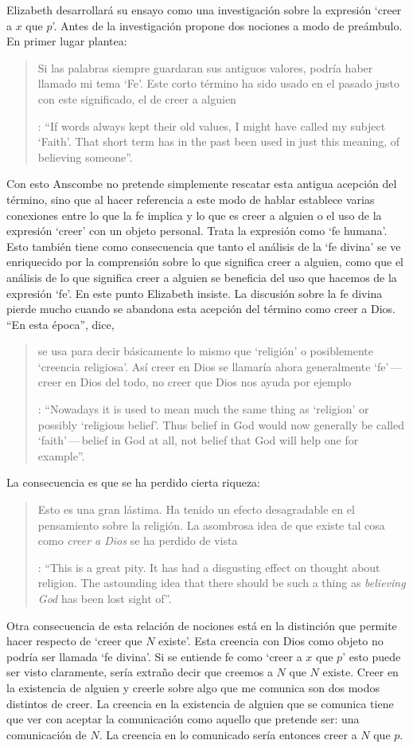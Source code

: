 Elizabeth desarrollará su ensayo como una investigación sobre la expresión \enquote*{creer a $x$ que $p$}. Antes de la investigación propone dos nociones a modo de preámbulo. En primer lugar plantea: \blockquote[{\Cite[1]{anscombe2008faith:tobelieve}}: \enquote{If words always kept their old values, I might have called my subject `Faith'. That short term has in the past been used in just this meaning, of believing someone}.]{Si las palabras siempre guardaran sus antiguos valores, podría haber llamado mi tema `Fe'. Este corto término ha sido usado en el pasado justo con este significado, el de creer a alguien}. Con esto Anscombe no pretende simplemente rescatar esta antigua acepción del término, sino que al hacer referencia a este modo de hablar establece varias conexiones entre lo que la fe implica y lo que es creer a alguien o el uso de la expresión `creer' con un objeto personal. Trata la expresión como `fe humana'. Esto también tiene como consecuencia que tanto el análisis de la `fe divina' se ve enriquecido por la comprensión sobre lo que significa creer a alguien, como que el análisis de lo que significa creer a alguien se beneficia del uso que hacemos de la expresión `fe'. En este punto Elizabeth insiste. La discusión sobre la fe divina pierde mucho cuando se abandona esta acepción del término como creer a Dios. \enquote{En esta época}, dice, \blockquote[{\Cite{anscombe2008faith:tobelieve}}: \enquote{Nowadays it is used to mean much the same thing as `religion' or possibly `religious belief'. Thus belief in God would now generally be called `faith'\,---\,belief in God at all, not belief that God will help one for example}.]{se usa para decir básicamente lo mismo que `religión' o posiblemente `creencia religiosa'. Así creer en Dios se llamaría ahora generalmente `fe'\,---\,creer en Dios del todo, no creer que Dios nos ayuda por ejemplo}. La consecuencia es que se ha perdido cierta riqueza: \blockquote[{\Cite{anscombe2008faith:tobelieve}}: \enquote{This is a great pity. It has had a disgusting effect on thought about religion. The astounding idea that there should be such a thing as \emph{believing God} has been lost sight of}.]{Esto es una gran lástima. Ha tenido un efecto desagradable en el pensamiento sobre la religión. La asombrosa idea de que existe tal cosa como \emph{creer a Dios} se ha perdido de vista}.

Otra consecuencia de esta relación de nociones está en la distinción que permite hacer respecto de \enquote*{creer que $N$ existe}. Esta creencia con Dios como objeto no podría ser llamada `fe divina'. Si se entiende fe como \enquote*{creer a $x$ que $p$} esto puede ser visto claramente, sería extraño decir que creemos a $N$ que $N$ existe. Creer en la existencia de alguien y creerle sobre algo que me comunica son dos modos distintos de creer. La creencia en la existencia de alguien que se comunica tiene que ver con aceptar la comunicación como aquello que pretende ser: una comunicación de $N$. La creencia en lo comunicado sería entonces creer a $N$ que $p$.


